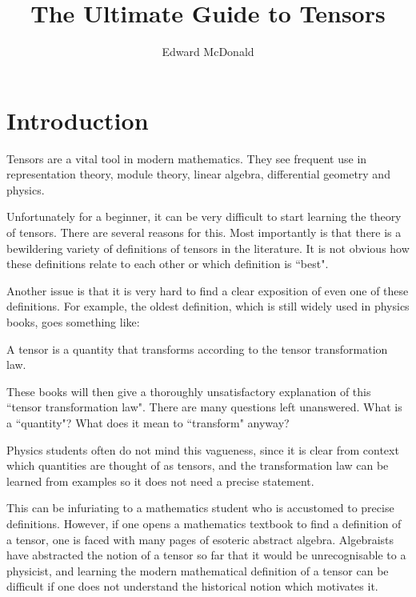 \documentclass{owmaths}
\begin{document}
\subject{Misc.}
\author{Edward McDonald}
\title{The Ultimate Guide to Tensors}

\newcommand{\Cliff}{\operatorname{Cliff}}
\newcommand{\Cl}{C\ell}
\newcommand{\im}{\operatorname{im}}
\newcommand{\com}{\mathrm{com}}
\newcommand{\Hom}{\operatorname{Hom}}
\newcommand{\A}{\mathcal{A}}
\newcommand{\Hilb}{\mathcal{H}}
\newcommand{\D}{\mathcal{D}}
\newcommand{\End}{\operatorname{End}}
\newcommand{\Mult}{\operatorname{Mult}}
\newcommand{\isom}{\cong}

\setlength\parindent{0pt}


\section{Introduction}
Tensors are a vital tool in modern mathematics. They see
frequent use in representation theory, module theory, linear algebra, differential
geometry and physics. 

Unfortunately for a beginner, it can be very difficult to start learning
the theory of tensors. There are several reasons for this.
Most importantly is that there is a bewildering variety of 
definitions of tensors in the literature. It is not obvious
how these definitions relate to each other or which definition is ``best".

Another issue is that it is very hard to find a clear exposition of even one 
of these definitions. For example, the oldest definition, which is still
widely used in physics books, goes something like:
\begin{displayquote}
A tensor is a quantity that transforms according to the tensor 
transformation law.
\end{displayquote}
These books will then give a thoroughly unsatisfactory explanation of this
``tensor transformation law". There are many questions left unanswered.
What is a ``quantity"? What does it mean to ``transform" anyway?

Physics students often do not mind this 
vagueness, since it is clear from context which quantities are thought of as tensors,
and the transformation law can be learned from examples so it does not need a
precise statement.

This can be infuriating to a mathematics student who is accustomed to
precise definitions. However, if one opens a mathematics textbook to find a definition
of a tensor, one is faced with many pages of esoteric abstract algebra. Algebraists
have abstracted the notion of a tensor so far that it would be unrecognisable
to a physicist, and learning the modern mathematical definition of a tensor
can be difficult if one does not understand the historical notion which
motivates it.
\end{document}
